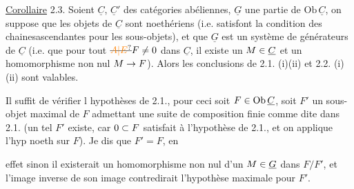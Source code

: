 \uline{Corollaire} 2.3. Soient $\underline C$, $\underline C'$ des catégories abéliennes, $\underline G$ une partie de $\mathrm{Ob}\,\underline C$, on suppose que les objets de $\underline C$ sont noethériens (i.e. satisfont la condition des chaines\handwritten{\unsure{/}}ascendantes pour les sous-objets), et que $\underline G$ est un système de générateurs de $\underline C$ (i.e. que pour tout $\deleted{\unsure{A|E}}F\handwritten{\ne}0$ dans $\underline C$, il existe un $M\in\underline C$ et un homomorphisme non nul $M\to F$). Alors les conclusions de 2.1. (i)(ii) et 2.2. (i)(ii) sont valables.

Il suffit de vérifier l hypothèses de 2.1., pour ceci soit $F\in\mathrm{Ob}\,\underline C$,  soit $F'$ un sous-objet maximal de $F$ admettant une suite de composition finie comme dite dans 2.1. (un tel $F'$ existe, car $0\subset F$ satisfait à l'hypothèse de 2.1., et on applique l'hyp noeth sur $F$). Je dis que $F'=F$, en 

effet sinon il existerait un homomorphisme non nul d'un $M\in\underline G$ dans $F/F'$,
et l'image inverse  de son image  contredirait l'hypothèse maximale
pour $F'$.

